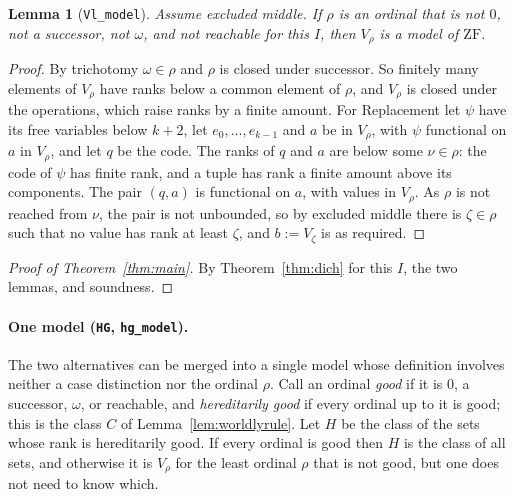 \documentclass[10pt]{article}
\newtheorem{lemma}[theorem]{Lemma}
\theoremstyle{definition}
\theoremstyle{remark}
\newcommand{\ZF}{\mathrm{ZF}}
\newcommand{\lean}[1]{\texttt{#1}}
\begin{document}
\begin{lemma}[\lean{Vl\_model}]\label{lem:vrho}
Assume excluded middle. If $\rho$ is an ordinal that is not $0$, not a
successor, not $\omega$, and not reachable for this $I$, then $V_\rho$ is a model
of $\ZF$.
\end{lemma}
\begin{proof}
By trichotomy $\omega\in\rho$ and $\rho$ is closed under successor. So finitely
many elements of $V_\rho$ have ranks below a common element of $\rho$, and
$V_\rho$ is closed under the operations, which raise ranks by a finite
amount. For Replacement let $\psi$ have its free variables below $k+2$, let
$e_0,\dots,e_{k-1}$ and $a$ be in $V_\rho$, with $\psi$ functional on $a$ in
$V_\rho$, and let $q$ be the code. The ranks of $q$ and $a$ are below some
$\nu\in\rho$: the code of $\psi$ has finite rank, and a tuple has rank a finite
amount above its components. The pair $(q,a)$ is functional on $a$, with
values in $V_\rho$. As $\rho$ is not reached from $\nu$, the pair is not
unbounded, so by excluded middle there is $\zeta\in\rho$ such that no value has
rank at least $\zeta$, and $b:=V_\zeta$ is as required.
\end{proof}

\begin{proof}[Proof of Theorem~\ref{thm:main}]
By Theorem~\ref{thm:dich} for this $I$, the two lemmas, and soundness.
\end{proof}

\paragraph{One model (\lean{HG}, \lean{hg\_model}).}
The two alternatives can be merged into a single model whose definition
involves neither a case distinction nor the ordinal $\rho$. Call an
ordinal \emph{good} if it is $0$, a successor, $\omega$, or reachable, and
\emph{hereditarily good} if every ordinal up to it is good; this is the
class $C$ of Lemma~\ref{lem:worldlyrule}. Let $H$ be the class of the
sets whose rank is hereditarily good. If every ordinal is good then $H$
is the class of all sets, and otherwise it is $V_\rho$ for the least
ordinal $\rho$ that is not good, but one does not need to know which.
\end{document}
